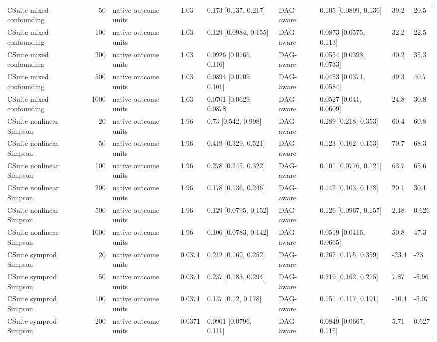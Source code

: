 \begin{tabular}{lrlllllll}
CSuite mixed confounding & 50 & native outcome units & 1.03 & 0.173 [0.137, 0.217] & DAG-aware & 0.105 [0.0899, 0.136] & 39.2 & 20.5 \\
CSuite mixed confounding & 100 & native outcome units & 1.03 & 0.129 [0.0984, 0.155] & DAG-aware & 0.0873 [0.0575, 0.113] & 32.2 & 22.5 \\
CSuite mixed confounding & 200 & native outcome units & 1.03 & 0.0926 [0.0766, 0.116] & DAG-aware & 0.0554 [0.0398, 0.0733] & 40.2 & 35.3 \\
CSuite mixed confounding & 500 & native outcome units & 1.03 & 0.0894 [0.0709, 0.101] & DAG-aware & 0.0453 [0.0371, 0.0584] & 49.3 & 40.7 \\
CSuite mixed confounding & 1000 & native outcome units & 1.03 & 0.0701 [0.0629, 0.0878] & DAG-aware & 0.0527 [0.041, 0.0609] & 24.8 & 30.8 \\
CSuite nonlinear Simpson & 20 & native outcome units & 1.96 & 0.73 [0.542, 0.998] & DAG-aware & 0.289 [0.218, 0.353] & 60.4 & 60.8 \\
CSuite nonlinear Simpson & 50 & native outcome units & 1.96 & 0.419 [0.329, 0.521] & DAG-aware & 0.123 [0.102, 0.153] & 70.7 & 68.3 \\
CSuite nonlinear Simpson & 100 & native outcome units & 1.96 & 0.278 [0.245, 0.322] & DAG-aware & 0.101 [0.0776, 0.121] & 63.7 & 65.6 \\
CSuite nonlinear Simpson & 200 & native outcome units & 1.96 & 0.178 [0.136, 0.246] & DAG-aware & 0.142 [0.103, 0.178] & 20.1 & 30.1 \\
CSuite nonlinear Simpson & 500 & native outcome units & 1.96 & 0.129 [0.0795, 0.152] & DAG-aware & 0.126 [0.0967, 0.157] & 2.18 & 0.626 \\
CSuite nonlinear Simpson & 1000 & native outcome units & 1.96 & 0.106 [0.0783, 0.142] & DAG-aware & 0.0519 [0.0416, 0.0665] & 50.8 & 47.3 \\
CSuite symprod Simpson & 20 & native outcome units & 0.0371 & 0.212 [0.169, 0.252] & DAG-aware & 0.262 [0.175, 0.359] & -23.4 & -23 \\
CSuite symprod Simpson & 50 & native outcome units & 0.0371 & 0.237 [0.183, 0.294] & DAG-aware & 0.219 [0.162, 0.275] & 7.87 & -5.96 \\
CSuite symprod Simpson & 100 & native outcome units & 0.0371 & 0.137 [0.12, 0.178] & DAG-aware & 0.151 [0.117, 0.191] & -10.4 & -5.07 \\
CSuite symprod Simpson & 200 & native outcome units & 0.0371 & 0.0901 [0.0796, 0.111] & DAG-aware & 0.0849 [0.0667, 0.115] & 5.71 & 0.627 \\

\end{tabular}
